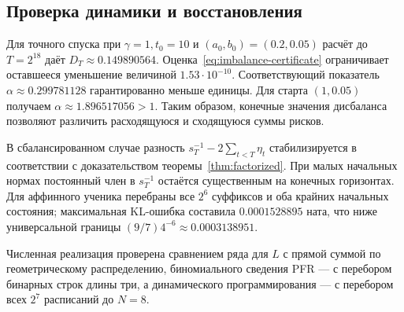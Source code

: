\subsection{Проверка динамики и восстановления}

Для точного спуска при $\gamma=1,t_0=10$ и
$(a_0,b_0)=(0.2,0.05)$ расчёт до $T=2^{18}$ даёт
$D_T\approx0.149890564$. Оценка~\eqref{eq:imbalance-certificate}
ограничивает оставшееся уменьшение величиной $1.53\cdot10^{-10}$.
Соответствующий показатель $\alpha\approx0.299781128$ гарантированно меньше
единицы. Для старта $(1,0.05)$ получаем
$\alpha\approx1.896517056>1$. Таким образом, конечные значения дисбаланса
позволяют различить расходящуюся и сходящуюся суммы рисков.

В сбалансированном случае разность $s_T^{-1}-2\sum_{t<T}\eta_t$
стабилизируется в соответствии с доказательством теоремы~\ref{thm:factorized}.
При малых начальных нормах постоянный член в $s_T^{-1}$ остаётся существенным
на конечных горизонтах. Для аффинного ученика перебраны все $2^6$ суффиксов и оба
крайних начальных состояния; максимальная KL-ошибка составила
$0.0001528895$ ната, что ниже универсальной границы
$(9/7)4^{-6}\approx0.0003138951$.

Численная реализация проверена сравнением ряда для $L$ с прямой суммой
по геометрическому распределению, биномиального сведения PFR --- с перебором
бинарных строк длины три, а динамического программирования --- с перебором
всех $2^7$ расписаний до $N=8$.
